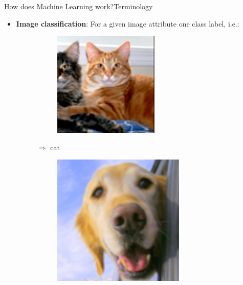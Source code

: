 \documentclass{beamer}
\begin{document}
\begin{frame}{How does Machine Learning work?}{Terminology}
\begin{itemize}
	\item \textbf{Image classification}: For a given image attribute one class label, i.e.:
	\begin{figure}[H]
		\begin{subfigure}{.1\textwidth}
			\includegraphics[width=\textwidth]{cat} 
		\end{subfigure} $\Rightarrow$ cat
		\begin{subfigure}{.1\textwidth}
			\includegraphics[width=\textwidth]{dog}

\end{subfigure}
\end{figure}
\end{itemize}
\end{frame}
\end{document}
